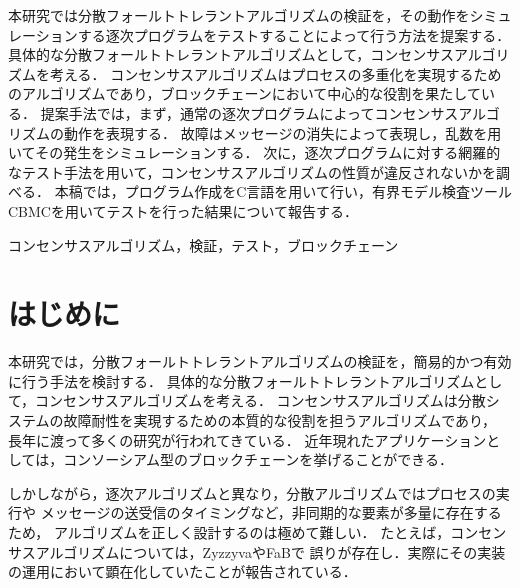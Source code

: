 \documentclass[technicalreport]{ieicej}
\def\IEICEJcls{\texttt{ieicej.cls}}
\def\IEICEJver{3.1}
\theoremstyle{plain}
\begin{document}
\begin{jabstract}
本研究では分散フォールトトレラントアルゴリズムの検証を，その動作をシミュレーションする逐次プログラムをテストすることによって行う方法を提案する．
具体的な分散フォールトトレラントアルゴリズムとして，コンセンサスアルゴリズムを考える．
コンセンサスアルゴリズムはプロセスの多重化を実現するためのアルゴリズムであり，ブロックチェーンにおいて中心的な役割を果たしている．
提案手法では，まず，通常の逐次プログラムによってコンセンサスアルゴリズムの動作を表現する．
故障はメッセージの消失によって表現し，乱数を用いてその発生をシミュレーションする．
次に，逐次プログラムに対する網羅的なテスト手法を用いて，コンセンサスアルゴリズムの性質が違反されないかを調べる．
本稿では，プログラム作成をC言語を用いて行い，有界モデル検査ツールCBMCを用いてテストを行った結果について報告する．
\end{jabstract}
\begin{jkeyword}
	コンセンサスアルゴリズム，検証，テスト，ブロックチェーン
\end{jkeyword}
\maketitle

\section{はじめに}

本研究では，分散フォールトトレラントアルゴリズムの検証を，簡易的かつ有効に行う手法を検討する．
具体的な分散フォールトトレラントアルゴリズムとして，コンセンサスアルゴリズムを考える．
コンセンサスアルゴリズムは分散システムの故障耐性を実現するための本質的な役割を担うアルゴリズムであり，
長年に渡って多くの研究が行われてきている．
近年現れたアプリケーションとしては，コンソーシアム型のブロックチェーンを挙げることができる．

しかしながら，逐次アルゴリズムと異なり，分散アルゴリズムではプロセスの実行や
メッセージの送受信のタイミングなど，非同期的な要素が多量に存在するため，
アルゴリズムを正しく設計するのは極めて難しい．
たとえば，コンセンサスアルゴリズムについては，Zyzzyva\cite{KotlaADCW09}やFaB\cite{MartinA05}で
誤りが存在し．実際にその実装の運用において顕在化していたことが報告されている．
\end{document}
